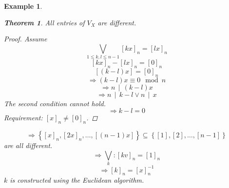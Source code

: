 \documentclass[a4paper,landscape,twocolumn]{article}
\newcommand\set[1]{\left\{#1\right\}}
\newcommand\divides[2]{#1\,\mid\,#2}
\newtheorem{theorem}{Theorem}
\newtheorem{ex}{Example}
\begin{document}
\begin{ex}
\begin{description}
      \begin{theorem}
        All entries of $V_X$ are different.
      \end{theorem}
      \begin{proof}
        Assume
        \[ \bigvee_{1 \leq k, l \leq n-1} [kx]_n = [lx]_n \]
        \[ [kx]_n - [lx]_n = [0]_n \]
        \[ [(k-l) x] = [0]_n \]
        \[ \Rightarrow (k-l) x \equiv 0 \mod{n} \]
        \[ \Rightarrow \divides{n}{(k-l)x} \]
        \[ \Rightarrow \divides{n}{k-l} \lor \divides{n}{x} \]
        The second condition cannot hold.
        \[ \Rightarrow k - l = 0 \]
        Requirement: $[x]_n \neq [0]_n$.
      \end{proof}

      \[ \Rightarrow \set{[x]_n, [2x]_n, \ldots, [(n-1)x]} \subseteq \set{[1], [2], \ldots, [n-1]} \]
      are all different.
      \[ \Rightarrow \bigvee_{k}: [kv]_n = [1]_n \]
      \[ \Rightarrow [k]_n = [x]_n^{-1} \]
      $k$ is constructed using the Euclidean algorithm.
  \end{description}
\end{ex}
\end{document}
